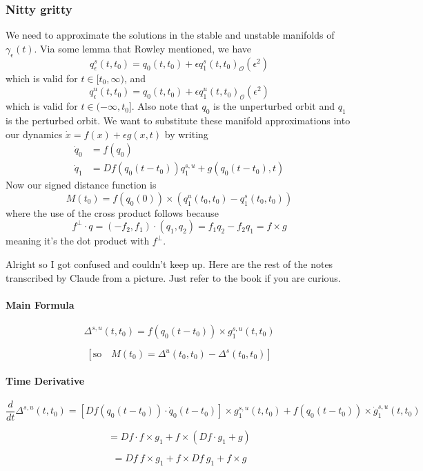 \documentclass{article}
\begin{document}
\subsubsection{Nitty gritty}

We need to approximate the solutions in the stable and unstable manifolds of $\gamma_\epsilon(t)$. Via some lemma that Rowley mentioned, we have 
\[
q^s_\epsilon(t,t_0) = q_0(t,t_0) + \epsilon q_1^s (t,t_0) _ \mathcal{O}(\epsilon^2)
\]
which is valid for $t\in[t_0,\infty)$, and 
\[
q^u_\epsilon(t,t_0) = q_0(t,t_0) + \epsilon q_1^u (t,t_0) _ \mathcal{O}(\epsilon^2)
\]
which is valid for $t\in(-\infty, t_0]$. Also note that $q_0$ is the unperturbed orbit and $q_1$ is the perturbed orbit. We want to substitute these manifold approximations into our dynamics $\dot{x} = f(x) + \epsilon g(x,t)$ by writing
\begin{align*}
    \dot{q}_0&=f(q_0)\\
    \dot{q}_1&=Df(q_0(t-t_0))q^{s,u}_1+g(q_0(t-t_0),t)
\end{align*}
Now our signed distance function is 
\[
M(t_0) = f(q_0(0))\times \left(q^u_1(t_0,t_0)-q^s_1(t_0,t_0)\right)
\]
where the use of the cross product follows because 
\[
f^\bot\cdot q=(-f_2,f_1)\cdot(q_1,q_2)=f_1q_2 - f_2q_1 = f\times g
\]
meaning it's the dot product with $f^\bot$.

Alright so I got confused and couldn't keep up. Here are the rest of the notes transcribed by Claude from a picture. Just refer to the book if you are curious.

\paragraph{Main Formula}
\[
\Delta^{s,u}(t, t_0) = f(q_0(t - t_0)) \times g_1^{s,u}(t, t_0)
\]

\[
\left[ \text{so} \quad M(t_0) = \Delta^u(t_0, t_0) - \Delta^s(t_0, t_0) \right]
\]

\paragraph{Time Derivative}
\[
\frac{d}{dt} \Delta^{s,u}(t, t_0) 
= \left[ Df(q_0(t-t_0)) \cdot \dot{q}_0(t - t_0) \right] \times g_1^{s,u}(t, t_0)
+ f(q_0(t - t_0)) \times \dot{g}_1^{s,u}(t, t_0)
\]

\[
= Df \cdot f \times g_1 + f \times (Df \cdot g_1 + g)
\]

\[
= Df\ f \times g_1 + f \times Df\ g_1 + f \times g
\]
\end{document}
